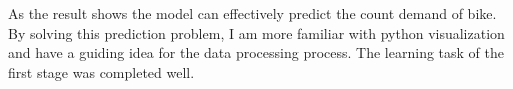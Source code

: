 \documentclass{amsart}
\begin{document}
As the result shows the model can effectively predict the count demand of bike. By solving this prediction problem, I am more familiar with python visualization and have a guiding idea for the data processing process. The learning task of the first stage was completed well.







\newpage



\end{document}
